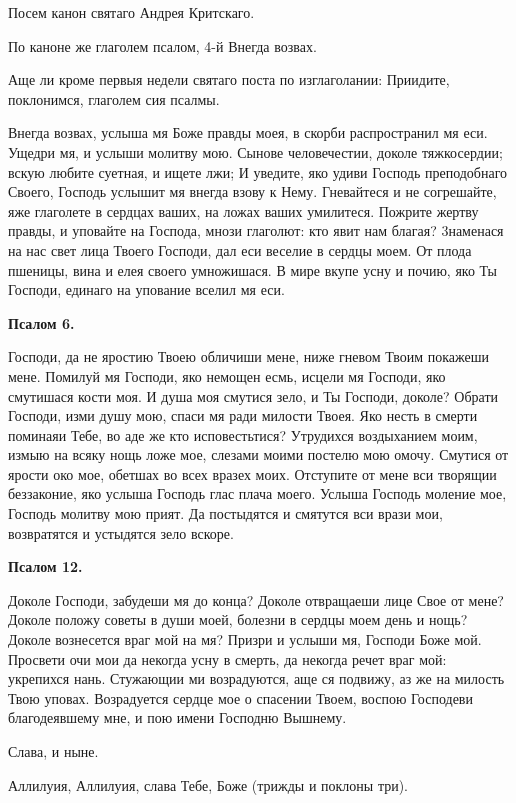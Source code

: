 Посем канон святаго Андрея Критскаго.

По каноне же глаголем псалом, 4-й Внегда возвах.

Аще ли кроме первыя недели святаго поста по изглаголании: Приидите, поклонимся, глаголем сия псалмы.

Внегда возвах, услыша мя Боже правды моея, в скорби распространил мя еси. Ущедри мя, и услыши молитву мою. Сынове человечестии, доколе тяжкосердии; вскую любите суетная, и ищете лжи; И уведите, яко удиви Господь преподобнаго Своего, Господь услышит мя внегда взову к Нему. Гневайтеся и не согрешайте, яже глаголете в сердцах ваших, на ложах ваших умилитеся. Пожрите жертву правды, и уповайте на Господа, мнози глаголют: кто явит нам благая? 3наменася на нас свет лица Твоего Господи, дал еси веселие в сердцы моем. От плода пшеницы, вина и елея своего умножишася. В мире вкупе усну и почию, яко Ты Господи, единаго на упование вселил мя еси.


\medskip


\bfseries Псалом 6.\normalfont{}\nopagebreak


Господи, да не яростию Твоею обличиши мене, ниже гневом Твоим покажеши мене. Помилуй мя Господи, яко немощен есмь, исцели мя Господи, яко смутишася кости моя. И душа моя смутися зело, и Ты Господи, доколе? Обрати Господи, изми душу мою, спаси мя ради милости Твоея. Яко несть в смерти поминаяи Тебе, во аде же кто исповестьтися? Утрудихся воздыханием моим, измыю на всяку нощь ложе мое, слезами моими постелю мою омочу. Смутися от ярости око мое, обетшах во всех вразех моих. Отступите от мене вси творящии беззаконие, яко услыша Господь глас плача моего. Услыша Господь моление мое, Господь молитву мою прият. Да постыдятся и смятутся вси врази мои, возвратятся и устыдятся зело вскоре.


\medskip


\bfseries Псалом 12.\normalfont{}\nopagebreak


Доколе Господи, забудеши мя до конца? Доколе отвращаеши лице Свое от мене? Доколе положу советы в души моей, болезни в сердцы моем день и нощь? Доколе вознесется враг мой на мя? Призри и услыши мя, Господи Боже мой. Просвети очи мои да некогда усну в смерть, да некогда речет враг мой: укрепихся нань. Стужающии ми возрадуются, аще ся подвижу, аз же на милость Твою уповах. Возрадуется сердце мое о спасении Твоем, воспою Господеви благодеявшему мне, и пою имени Господню Вышнему.

Слава, и ныне. 

Аллилуия, Аллилуия, слава Тебе, Боже (трижды и поклоны три). 

